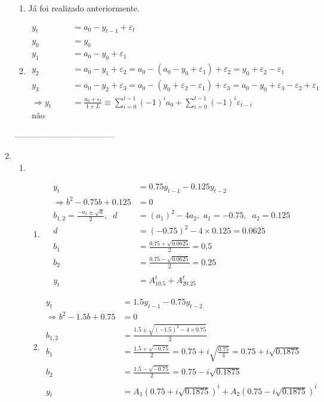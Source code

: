 \begin{enumerate}
\begin{enumerate}
	\item %
	Já foi realizado anteriormente.
	
	\item %
	
	\begin{align*}
		y_t&=a_0-y_{t-1}+\varepsilon_t\\
		\\
		y_0&=y_0\\
		y_1&=a_0-y_0+\varepsilon_1\\
		y_2&=a_0-y_1+\varepsilon_2=a_0-(a_0-y_0+\varepsilon_1)+\varepsilon_2=y_0+\varepsilon_2-\varepsilon_1\\
		y_3&=a_0-y_{2}+\varepsilon_3=a_0-(y_0+\varepsilon_2-\varepsilon_1)+\varepsilon_3=a_0-y_0+\varepsilon_3-\varepsilon_2+\varepsilon_1\\
		\Rightarrow y_t&=\frac{a_0+\varepsilon_t}{1+L}\equiv \sum\limits_{i=0}^{t-1}(-1)^ia_0+\sum\limits_{i=0}^{t-1}(-1)^i\varepsilon_{t-i}\\
		\text{não converge.}&
	\end{align*}		
\end{enumerate}

	------------------------------------

\item %
\begin{enumerate}
	\item %
	\begin{enumerate}
		\item %
		\begin{align*} 
		y_t&=0.75y_{t-1}-0.125y_{t-2}\\
		\Rightarrow b^2-0.75b+0.125&=0\\
		b_{1,2}=\frac{-a_1\pm\sqrt{d}}{2}, \;\;d&=(a_1)^2-4a_2,\,\,a_1=-0.75, \;\;a_2=0.125\\
		d&=(-0.75)^2-4\times0.125=0.0625\\
		b_1&=\frac{0.75+\sqrt{0.0625}}{2}=0.5\\
		b_2&=\frac{0.75-\sqrt{0.0625}}{2}=0.25\\
		\\
		y_t&=A_10.5^t+A_20.25^t
	\end{align*}
	
	\item %
	\begin{align*}
		y_t&=1.5y_{t-1}-0.75y_{t-2}\\
		\Rightarrow b^2-1.5b+0.75&=0\\
		b_{1,2}&=\frac{1.5\pm\sqrt{(-1.5)^2-4\times 0.75}}{2}\\
		b_{1}&=\frac{1.5+\sqrt{-0.75}}{2}=0.75+i\sqrt{\frac{0.75}{4}}=0.75+i\sqrt{0.1875}\\
		b_{2}&=\frac{1.5-\sqrt{-0.75}}{2}=0.75-i\sqrt{0.1875}\\
		\\
		y_t&=A_1(0.75+i\sqrt{0.1875})^t+A_2(0.75-i\sqrt{0.1875})^t
	\end{align*}		
		

\end{enumerate}
\end{enumerate}
\end{enumerate}
